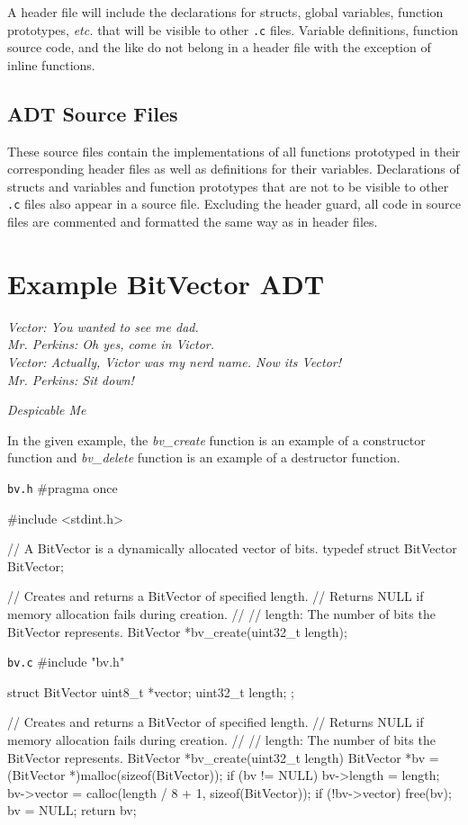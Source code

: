 \documentclass[11pt]{article}
\begin{document}
A header file will include the declarations for structs, global variables,
function prototypes, \emph{etc.} that will be visible to other \texttt{.c}
files. Variable definitions, function source code, and the like do not belong in
a header file with the exception of inline functions.


\subsection{ADT Source Files}

These source files contain the implementations of all functions prototyped in
their corresponding header files as well as definitions for their variables.
Declarations of structs and variables and function prototypes that are not to be
visible to other \texttt{.c} files also appear in a source file.  Excluding the
header guard, all code in source files are commented and formatted the same way
as in header files.


\section{Example BitVector ADT}

\textwidth
\epigraph{\emph{
Vector: You wanted to see me dad. \\
Mr. Perkins: Oh yes, come in Victor. \\
Vector: Actually, Victor was my nerd name. Now its Vector! \\
Mr. Perkins: Sit down!
}}{\emph{Despicable Me}}

\noindent In the given example, the \emph{bv\_create} function is an example of a constructor function and
 \emph{bv\_delete} function is an example of a destructor function.

\begin{clisting}{\texttt{bv.h}}
#pragma once

#include <stdint.h>

// A BitVector is a dynamically allocated vector of bits.
typedef struct BitVector BitVector;

// Creates and returns a BitVector of specified length.
// Returns NULL if memory allocation fails during creation.
//
// length: The number of bits the BitVector represents.
BitVector *bv_create(uint32_t length);
\end{clisting}

\begin{clisting}{\texttt{bv.c}}
#include "bv.h"

struct BitVector {
    uint8_t *vector;
    uint32_t length;
};

// Creates and returns a BitVector of specified length.
// Returns NULL if memory allocation fails during creation.
//
// length: The number of bits the BitVector represents.
BitVector *bv_create(uint32_t length) {
    BitVector *bv = (BitVector *)malloc(sizeof(BitVector));
    if (bv != NULL) {
        bv->length = length;
        bv->vector = calloc(length / 8 + 1, sizeof(BitVector));
        if (!bv->vector) {
            free(bv);
            bv = NULL;
        }
    }
    return bv;
}
\end{clisting}
\end{document}
